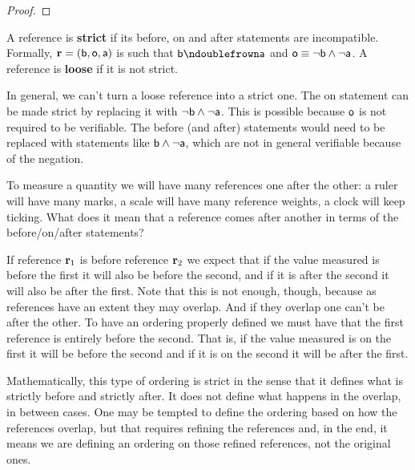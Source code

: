 \begin{mathSection}
\begin{proof}
	\end{proof}
	\begin{defn}
		A reference is \textbf{strict} if its before, on and after statements are incompatible. Formally, $\refStmt = (\stmt[b], \stmt[o], \stmt[a])$ is such that $\stmt[b] \ncomp \stmt[a]$ and $\stmt[o] \equiv \NOT \stmt[b] \AND \NOT \stmt[a]$. A reference is \textbf{loose} if it is not strict.
	\end{defn}
	\begin{remark}
		In general, we can't turn a loose reference into a strict one. The on statement can be made strict by replacing it with $\NOT \stmt[b] \AND \NOT \stmt[a]$. This is possible because $\stmt[o]$ is not required to be verifiable. The before (and after) statements would need to be replaced with statements like $\stmt[b] \AND \NOT \stmt[a]$, which are not in general verifiable because of the negation.
	\end{remark}
\end{mathSection}

To measure a quantity we will have many references one after the other: a ruler will have many marks, a scale will have many reference weights, a clock will keep ticking. What does it mean that a reference comes after another in terms of the before/on/after statements?

If reference $\refStmt_1$ is before reference $\refStmt_2$ we expect that if the value measured is before the first it will also be before the second, and if it is after the second it will also be after the first. Note that this is not enough, though, because as references have an extent they may overlap. And if they overlap one can't be after the other. To have an ordering properly defined we must have that the first reference is entirely before the second. That is, if the value measured is on the first it will be before the second and if it is on the second it will be after the first.

Mathematically, this type of ordering is strict in the sense that it defines what is strictly before and strictly after. It does not define what happens in the overlap, in between cases. One may be tempted to define the ordering based on how the references overlap, but that requires refining the references and, in the end, it means we are defining an ordering on those refined references, not the original ones.

